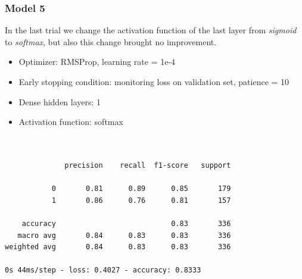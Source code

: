 \documentclass{article}
\begin{document}
\subsubsection{Model 5}
In the last trial we change the activation function of the last layer from \textit{sigmoid} to \textit{softmax}, but also this change brought no improvement.

\begin{itemize}
\item Optimizer: RMSProp, learning rate = 1e-4
\item Early stopping condition: monitoring loss on validation set, patience = 10
\item Dense hidden layers: 1
\item Activation function: softmax
\end{itemize}

\begin {verbatim}


              precision    recall  f1-score   support

           0       0.81      0.89      0.85       179
           1       0.86      0.76      0.81       157

    accuracy                           0.83       336
   macro avg       0.84      0.83      0.83       336
weighted avg       0.84      0.83      0.83       336

0s 44ms/step - loss: 0.4027 - accuracy: 0.8333

\end{verbatim}
\end{document}

